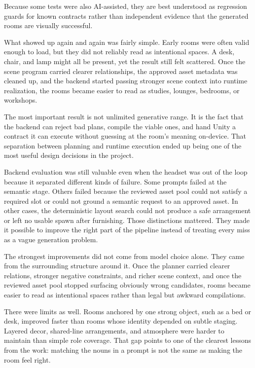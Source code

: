 \documentclass[12pt]{article}
\begin{document}
Because some tests were also AI-assisted, they are best understood as regression guards for known contracts rather than independent evidence that the generated rooms are visually successful.

What showed up again and again was fairly simple. Early rooms were often valid enough to load, but they did not reliably read as intentional spaces. A desk, chair, and lamp might all be present, yet the result still felt scattered. Once the scene program carried clearer relationships, the approved asset metadata was cleaned up, and the backend started passing stronger scene context into runtime realization, the rooms became easier to read as studies, lounges, bedrooms, or workshops.

The most important result is not unlimited generative range. It is the fact that the backend can reject bad plans, compile the viable ones, and hand Unity a contract it can execute without guessing at the room's meaning on-device. That separation between planning and runtime execution ended up being one of the most useful design decisions in the project.

Backend evaluation was still valuable even when the headset was out of the loop because it separated different kinds of failure. Some prompts failed at the semantic stage. Others failed because the reviewed asset pool could not satisfy a required slot or could not ground a semantic request to an approved asset. In other cases, the deterministic layout search could not produce a safe arrangement or left no usable spawn after furnishing. Those distinctions mattered. They made it possible to improve the right part of the pipeline instead of treating every miss as a vague generation problem.

The strongest improvements did not come from model choice alone. They came from the surrounding structure around it. Once the planner carried clearer relations, stronger negative constraints, and richer scene context, and once the reviewed asset pool stopped surfacing obviously wrong candidates, rooms became easier to read as intentional spaces rather than legal but awkward compilations.

There were limits as well. Rooms anchored by one strong object, such as a bed or desk, improved faster than rooms whose identity depended on subtle staging. Layered decor, shared-line arrangements, and atmosphere were harder to maintain than simple role coverage. That gap points to one of the clearest lessons from the work: matching the nouns in a prompt is not the same as making the room feel right.
\end{document}
